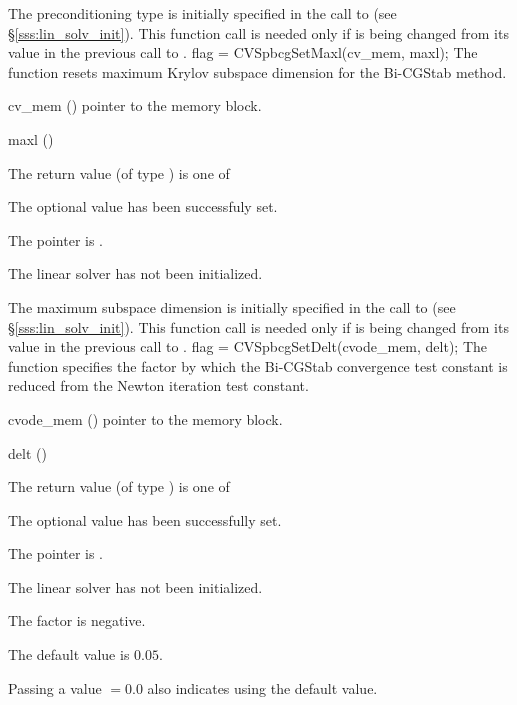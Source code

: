 {
  The preconditioning type is initially specified in the call
  to  (see \S\ref{sss:lin_solv_init}). This function call is
  needed only if  is being changed from its value in the
  previous call to .
}
{
  flag = CVSpbcgSetMaxl(cv\_mem, maxl);
}
{
  The function  resets maximum Krylov subspace
  dimension for the Bi-CGStab method.
}
{
  \begin{args}[cv\_mem]
  \item[cv\_mem] ()
    pointer to the {\cvodes} memory block.
  \item[maxl] ()

  \end{args}
}
{
  The return value  (of type ) is one of
  \begin{args}
  \item[\Id{CVSPBCG\_SUCCESS}] 
    The optional value has been successfuly set.
  \item[\Id{CVSPBCG\_MEM\_NULL}]
    The  pointer is .
  \item[\Id{CVSPBCG\_LMEM\_NULL}]
    The {\cvspbcg} linear solver has not been initialized.
  \end{args}
}
{
  The maximum subspace dimension is initially specified in the call
  to  (see \S\ref{sss:lin_solv_init}). This function call is
  needed only if  is being changed from its value in the
  previous call to .
}
{
  flag = CVSpbcgSetDelt(cvode\_mem, delt);
}
{
  The function  specifies the factor by which the
  Bi-CGStab convergence test constant is reduced
  from the Newton iteration test constant.
}
{
  \begin{args}
  \item[cvode\_mem] ()
    pointer to the {\cvodes} memory block.
  \item[delt] ()

  \end{args}
}
{
  The return value  (of type ) is one of
  \begin{args}
  \item[\Id{CVSPBCG\_SUCCESS}] 
    The optional value has been successfully set.
  \item[\Id{CVSPBCG\_MEM\_NULL}]
    The  pointer is .
  \item[\Id{CVSPBCG\_LMEM\_NULL}]
    The {\cvspbcg} linear solver has not been initialized.
  \item[\Id{CVSPBCG\_ILL\_INPUT}]
    The factor  is negative.  
  \end{args}
}
{
  The default value is $0.05$.

  Passing a value $ = 0.0$ also indicates using the default value.
}

